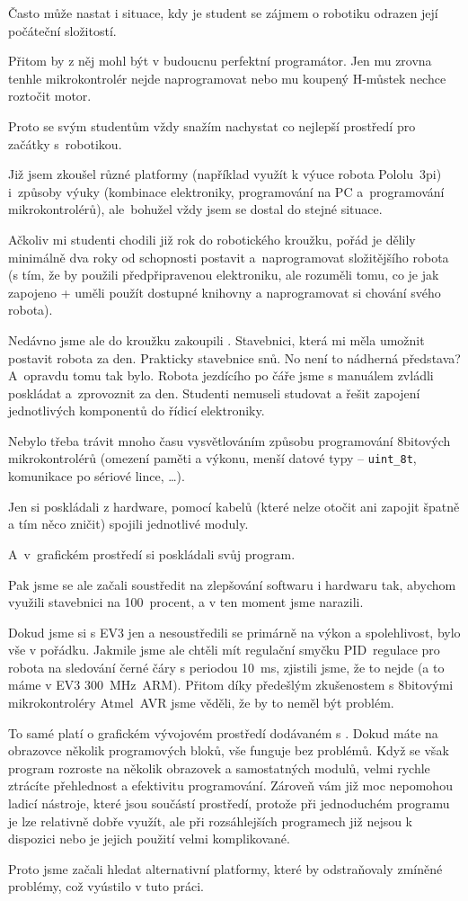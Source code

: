 Často může nastat i situace, kdy je student se zájmem o robotiku odrazen její počáteční složitostí.

Přitom by z něj mohl být v budoucnu perfektní programátor. 
Jen mu zrovna tenhle mikrokontrolér nejde naprogramovat nebo mu koupený H-můstek nechce roztočit motor.

Proto se svým studentům vždy snažím nachystat co nejlepší prostředí pro začátky s~robotikou. 

Již jsem zkoušel různé platformy (například využít k výuce robota Pololu~3pi) i~způsoby výuky (kombinace elektroniky, programování na PC a~programování mikrokontrolérů), ale~bohužel vždy jsem se dostal do stejné situace. 

Ačkoliv mi studenti chodili již rok do robotického kroužku, pořád je dělily minimálně dva roky od schopnosti postavit a~naprogramovat složitějšího robota (s tím, že by použili předpřipravenou elektroniku, ale rozuměli tomu, co je jak zapojeno + uměli použít dostupné knihovny a naprogramovat si chování svého robota).

Nedávno jsme ale do kroužku zakoupili \legoEV{}. 
Stavebnici, která mi měla umožnit postavit robota za den. 
Prakticky stavebnice snů. No není to nádherná představa?
A~opravdu tomu tak bylo. Robota jezdícího po čáře jsme s manuálem zvládli poskládat a~zprovoznit za den. 
Studenti nemuseli studovat a řešit zapojení jednotlivých komponentů do řídicí elektroniky. 

Nebylo třeba trávit mnoho času vysvětlováním způsobu programování 8bitových mikrokontrolérů (omezení paměti a výkonu, menší datové typy -- \verb|uint_8t|, komunikace po sériové lince, \dots).

Jen si poskládali z \lega{ }hardware, pomocí kabelů (které nelze otočit ani zapojit špatně a tím něco zničit) spojili jednotlivé moduly. 

A~v~grafickém prostředí si poskládali svůj program.

Pak jsme se ale začali soustředit na zlepšování softwaru i hardwaru tak, abychom využili stavebnici na 100~procent, a v ten moment jsme narazili.

Dokud jsme si s EV3 jen  a nesoustředili se primárně na výkon a spolehlivost, bylo vše v pořádku. 
Jakmile jsme ale chtěli mít regulační smyčku PID~regulace pro robota na sledování černé čáry s periodou 10~ms, zjistili jsme, že to nejde (a to máme v EV3  300~MHz~ARM). Přitom díky předešlým zkušenostem s 8bitovými mikrokontroléry Atmel~AVR jsme věděli, že by to neměl být problém.


To samé platí o grafickém vývojovém prostředí dodávaném s \EVthree. Dokud máte na obrazovce několik programových bloků, vše funguje bez problémů. 
Když se však program rozroste na několik obrazovek a samostatných modulů, velmi rychle ztrácíte přehlednost a efektivitu programování.
Zároveň vám již moc nepomohou ladicí nástroje, které jsou součástí prostředí, protože při jednoduchém programu je lze relativně dobře využít, ale při rozsáhlejších programech již nejsou k dispozici nebo je jejich použití velmi komplikované. 


Proto jsme začali hledat alternativní platformy, které by odstraňovaly zmíněné problémy, což vyústilo v tuto práci.   

